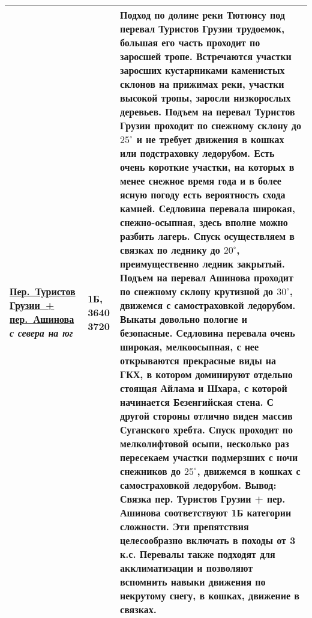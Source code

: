 {\begin{longtable}{|>{\centering\arraybackslash}m{3.8cm}|>{\centering\arraybackslash}m{1.3cm}|>{\raggedright\arraybackslash}m{12.5cm}|}
		 	\hyperref[subsec:Day4]{Пер.~Туристов Грузии~+ пер.~Ашинова}												\newline\textit{с севера на юг}			&	1Б, 3640 3720				&	Подход по долине реки Тютюнсу под перевал Туристов Грузии трудоемок, большая его часть проходит по заросшей тропе. Встречаются участки заросших кустарниками каменистых склонов на прижимах реки, участки высокой тропы, заросли низкорослых деревьев. Подъем на перевал Туристов Грузии проходит по снежному склону до $25^\circ$ и не требует движения в кошках или подстраховку ледорубом. Есть очень короткие участки, на которых в менее снежное время года и в более ясную погоду есть вероятность схода камней. Седловина перевала широкая, снежно-осыпная, здесь вполне можно разбить лагерь. Спуск осуществляем в связках по леднику до $20^\circ$, преимущественно ледник закрытый. Подъем на перевал Ашинова проходит по снежному склону крутизной до $30^\circ$, движемся с самостраховкой ледорубом. Выкаты довольно пологие и безопасные. Седловина перевала очень широкая, мелкоосыпная, с нее открываются прекрасные виды на ГКХ, в котором доминируют отдельно стоящая Айлама и Шхара, с которой начинается Безенгийская стена. С другой стороны отлично виден массив Суганского хребта. Спуск проходит по мелколифтовой осыпи, несколько раз пересекаем участки подмерзших с ночи снежников до $25^\circ$, движемся в кошках с самостраховкой ледорубом. \newline	\textbf{Вывод:} Связка пер. Туристов Грузии + пер. Ашинова соответствуют 1Б категории сложности. Эти препятствия целесообразно включать в походы от 3 к.с. Перевалы также подходят для акклиматизации и позволяют вспомнить навыки движения по некрутому снегу, в кошках, движение в связках.																																																																																																																					\\ \hline

\end{longtable}}
